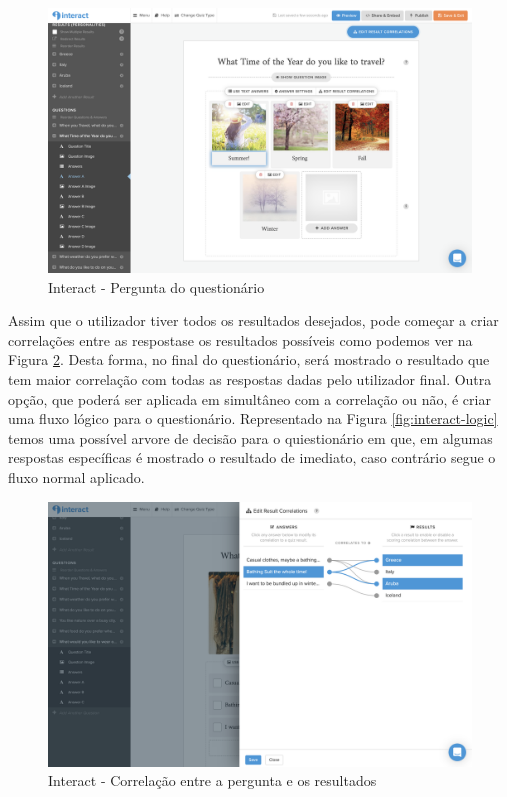 \begin{figure}[ht!]
	\begin{center}
		\includegraphics[width=1\textwidth]{img/interact/quest}
		\caption{Interact - Pergunta do questionário}
		\label{fig:interact-quest}
	\end{center}
\end{figure}


Assim que o utilizador tiver todos os resultados desejados, pode começar a criar correlações entre as respostase os resultados possíveis como podemos ver na Figura \ref{fig:interact-currelation}. Desta forma, no final do questionário, será mostrado o resultado que tem maior correlação com todas as respostas dadas pelo utilizador final. Outra opção, que poderá ser aplicada em simultâneo com a correlação ou não, é criar uma fluxo lógico para o questionário. Representado na Figura \ref{fig:interact-logic} temos uma possível arvore de decisão para o quiestionário em que, em algumas respostas específicas é mostrado o resultado de imediato, caso contrário segue o fluxo normal aplicado.

\begin{figure}[ht!]
	\begin{center}
		\includegraphics[width=1\textwidth]{img/interact/currelation}
		\caption{Interact - Correlação entre a pergunta e os resultados}
		\label{fig:interact-currelation}
	\end{center}
\end{figure}

